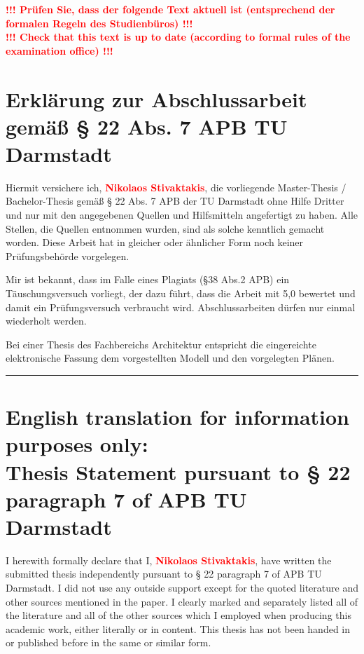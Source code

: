 \documentclass{cacthesis}
\begin{document}

	\newpage
	
	\textcolor{red}{\textbf{!!! Prüfen Sie, dass der folgende Text aktuell ist (entsprechend der formalen Regeln des Studienbüros) !!! \\
	!!! Check that this text is up to date (according to formal rules of the examination office) !!!}}
	
	\section*{Erklärung zur Abschlussarbeit gemäß § 22 Abs. 7 APB TU Darmstadt}
	
	Hiermit versichere ich, \textcolor{red}{\textbf{Nikolaos Stivaktakis}}, die vorliegende Master-Thesis / Bachelor-Thesis gemäß § 22 Abs. 7 APB der TU Darmstadt ohne Hilfe Dritter und nur mit den angegebenen Quellen und Hilfsmitteln angefertigt zu haben. Alle Stellen, die Quellen entnommen wurden, sind als solche kenntlich gemacht worden. Diese Arbeit hat in gleicher oder ähnlicher Form noch keiner Prüfungsbehörde vorgelegen. 
	
	Mir ist bekannt, dass im Falle eines Plagiats (§38 Abs.2 APB) ein Täuschungsversuch vorliegt, der dazu führt, dass die Arbeit mit 5,0 bewertet und damit ein Prüfungsversuch verbraucht wird. Abschlussarbeiten dürfen nur einmal wiederholt werden.
	
	Bei einer Thesis des Fachbereichs Architektur entspricht die eingereichte elektronische Fassung dem vorgestellten Modell und den vorgelegten Plänen.
	
	\vspace{10pt}
	\hrule
	
	\section*{English translation for information purposes only:\\Thesis Statement pursuant to § 22 paragraph 7 of APB TU Darmstadt}
	
	I herewith formally declare that I, \textcolor{red}{\textbf{Nikolaos Stivaktakis}}, have written the submitted thesis independently pursuant to § 22 paragraph 7 of APB TU Darmstadt. I did not use any outside support except for the quoted literature and other sources mentioned in the paper. I clearly marked and separately listed all of the literature and all of the other sources which I employed when producing this academic work, either literally or in content. This thesis has not been handed in or published before in the same or similar form.
	
\end{document}
